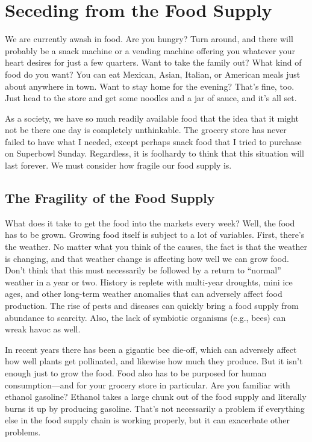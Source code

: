 \chapter{Seceding from the Food Supply}

We are currently awash in food. Are you hungry?  Turn around, and there
will probably be a snack machine or a vending machine offering you
whatever your heart desires for just a few quarters. Want to take the
family out? What kind of food do you want? You can eat Mexican, Asian,
Italian, or American meals just about anywhere in town. Want to stay
home for the evening?  That’s fine, too. Just head to the store and get
some noodles and a jar of sauce, and it’s all set.

As a society, we have so much readily available food that the idea that
it might not be there one day is completely unthinkable. The grocery
store has never failed to have what I needed, except perhaps snack food
that
I tried to purchase
on Superbowl Sunday. Regardless, it is foolhardy to think that this
situation will last forever. We must consider how fragile our food
supply is.

\section{The Fragility of the Food Supply}

What does it take to get the food into the markets every week?  Well,
the food has to be grown. Growing food itself is subject to a lot of
variables. First, there’s the weather.  No matter what you think of the
causes, the fact is that the weather is changing, and that weather
change is affecting how well we can grow food. Don’t think that this
must necessarily be followed by a return to “normal” weather in a year
or two. History is replete with multi-year droughts, mini ice ages, and
other long-term weather anomalies that can adversely affect food
production. The rise of pests and diseases can quickly bring a food
supply from abundance to scarcity. Also, the lack of symbiotic
organisms (e.g., bees) can wreak havoc as well. 

In recent years there has been a gigantic bee die-off, which can
adversely affect how well plants get pollinated, and likewise how much
they produce. But it isn’t enough just to grow the food. Food also has
to be purposed for human consumption—and for your grocery store in
particular. Are you familiar with ethanol gasoline? 
Ethanol takes a large
chunk out of the food
supply and literally burns it up by producing gasoline. That’s not
necessarily a problem if everything else in the food supply chain is
working properly, but it can exacerbate other problems. 

